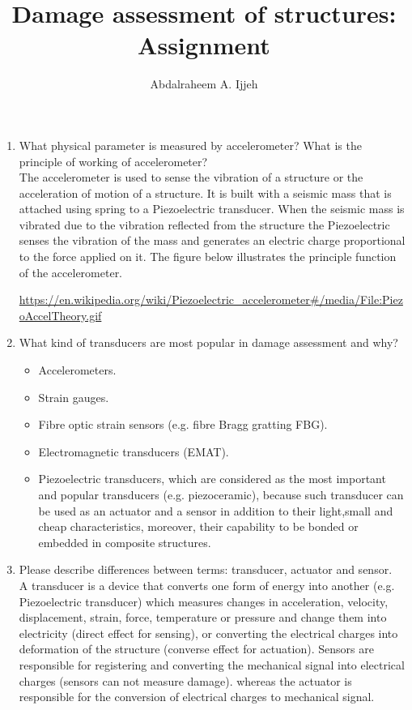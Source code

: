 \documentclass[11pt,a4paper]{article}
\title{Damage assessment of structures: Assignment}
\author{Abdalraheem A. Ijjeh}
\begin{document}
	\maketitle
	\begin{enumerate}
		\item  What physical parameter is measured by accelerometer? What is the principle of working of accelerometer? \\
		The accelerometer is used to sense the vibration of a structure or the acceleration of motion of a structure. 
		It is built with a seismic mass that is attached using spring to a Piezoelectric transducer.
		When the seismic mass is vibrated due to the vibration reflected from the structure the Piezoelectric senses the vibration of the mass and generates an electric charge proportional to the force applied on it. The figure below illustrates the principle function of the accelerometer. 
		\begin{center}
			 \tiny{\url{https://en.wikipedia.org/wiki/Piezoelectric_accelerometer#/media/File:PiezoAccelTheory.gif}}
		\end{center}
		
		\item  What kind of transducers are most popular in damage assessment and why?
		\begin{itemize}
			\item Accelerometers.
			\item Strain gauges.
			\item Fibre optic strain sensors (e.g. fibre Bragg gratting FBG).
			\item Electromagnetic transducers (EMAT).
			\item Piezoelectric transducers, which are considered as the most important and popular transducers (e.g. piezoceramic), because such transducer can be used as an actuator and a sensor in addition to their light,small and cheap characteristics, moreover, their capability to be bonded or embedded in composite structures.
		\end{itemize}

		
		\item  Please describe differences between terms: transducer, actuator and sensor. \\
	A transducer is a device that converts one form of energy into another (e.g. Piezoelectric transducer) which measures changes in acceleration, velocity, displacement, strain, force, temperature or pressure and change them into electricity (direct effect for sensing), or converting the electrical charges into deformation of the structure (converse effect for actuation).
	Sensors are responsible for registering and converting the mechanical signal into electrical charges (sensors can not measure damage).
	whereas the actuator is responsible for the conversion of electrical charges to mechanical signal.
	\end{enumerate}
 
\end{document}
